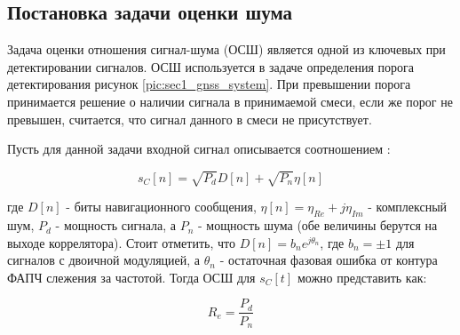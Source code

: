 \subsection{Постановка задачи оценки шума}
\label{sssec:sec1_noise_est}

Задача оценки отношения сигнал-шума (ОСШ) является одной из ключевых при детектировании сигналов.
ОСШ используется в задаче определения порога детектирования рисунок \ref{pic:sec1_gnss_system}.
При превышении порога принимается решение о наличии сигнала в принимаемой смеси, если же порог
не превышен, считается, что сигнал данного в смеси не присутствует.

Пусть для данной задачи входной сигнал описывается соотношением \cite{presti_ieee}:
\begin{center}
\begin{equation}
	\label{eq:noise_est_signal}
	s_C[n]=\sqrt{P_d}D[n] + \sqrt{P_n}\eta[n]
\end{equation}
\end{center}
где $D[n]$ - биты навигационного сообщения, $\eta[n]=\eta_{Re} + j\eta_{Im}$ - комплексный шум,
$P_d$ - мощность сигнала, а $P_n$ - мощность шума (обе величины берутся на выходе коррелятора).
Стоит отметить, что $D[n]=b_{n}e^{j\theta_n}$, где $b_n=\pm{1}$ для сигналов с двоичной модуляцией, а
$\theta_n$ - остаточная фазовая ошибка от контура ФАПЧ слежения за частотой.
Тогда ОСШ для $s_C[t]$ можно представить как:
\begin{center}
\begin{equation}
	\label{eq:noise_est_snr}
	R_e=\frac{P_d}{P_n}
\end{equation}
\end{center}

